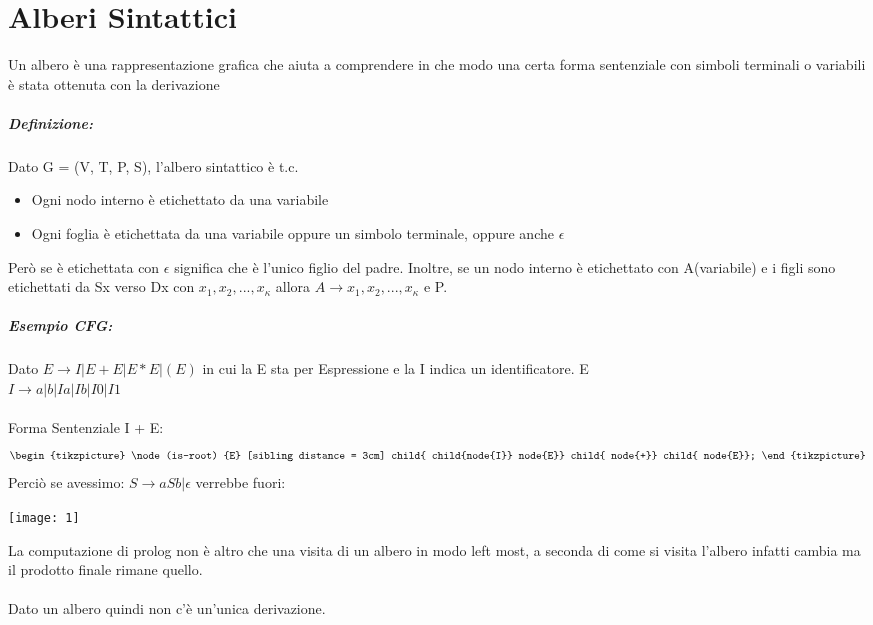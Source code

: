 \documentclass[12pt, a4paper, openany, oneside]{book}
\begin{document}
\chapter{Alberi Sintattici}
Un albero è una rappresentazione grafica che aiuta a comprendere in che modo una
certa forma sentenziale con simboli terminali o variabili è stata ottenuta con 
la derivazione
\paragraph{Definizione: }Dato G = (V, T, P, S), l'albero sintattico è t.c.
\begin{itemize}
	\item Ogni nodo interno è etichettato da una variabile
	\item Ogni foglia è etichettata da una variabile oppure un simbolo terminale,
	oppure anche $\epsilon$
\end{itemize}
Però se è etichettata con $\epsilon$ significa che è l'unico figlio del padre.
Inoltre, se un nodo interno è etichettato con A(variabile) e i figli sono
etichettati da Sx verso Dx con $x_{1}, x_{2}, ..., x_{\kappa}$ allora 
$A \to x_{1}, x_{2}, ..., x_{\kappa}$ e P.
\paragraph{Esempio CFG: } 
Dato $E \to I | E + E | E * E | (E)$ in cui la E sta per Espressione e la I
indica un identificatore. E \\
$I \to a | b | Ia | Ib | I0 | I1$ \\ \\ 
Forma Sentenziale I + E: \\
\[
\begin{tikzpicture}
\node (is-root) {E}
[sibling distance = 3cm]
child{ 
child{node{I}}
node{E}}
child{ node{+}}
child{ node{E}};
\end{tikzpicture}\]
Perciò se avessimo: $S \to aSb|\epsilon$ verrebbe fuori: \\
\begin{center}
\texttt{[image: 1]}
\end{center}
La computazione di prolog non è altro che una visita di un albero in modo left
most, a seconda di come si visita l'albero infatti cambia ma il prodotto finale
rimane quello.
\\ \\
Dato un albero quindi non c'è un'unica derivazione.
\end{document}
